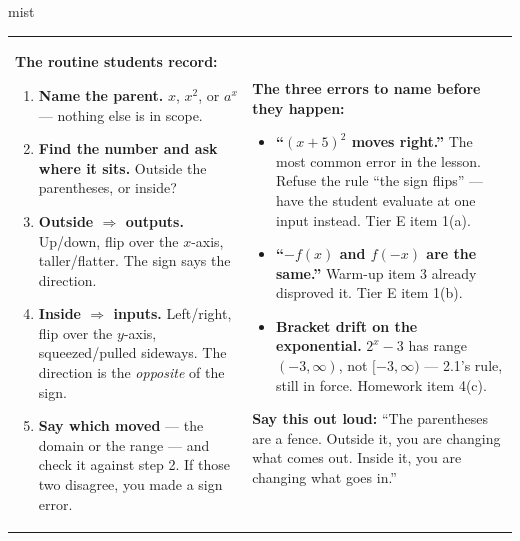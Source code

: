\documentclass[10pt]{article}
\begin{document}
\boxguard
\begin{skillbox}{mist}
\begin{tabularx}{\linewidth}{@{}X|X@{}}
\begin{minipage}[t]{\linewidth}\vspace{0pt}
\textbf{The routine students record:}
\begin{enumerate}[leftmargin=1.4em, itemsep=2pt, topsep=2pt]
  \item \textbf{Name the parent.} $x$, $x^2$, or $a^x$ --- nothing else is in scope.
  \item \textbf{Find the number and ask where it sits.} Outside the parentheses, or inside?
  \item \textbf{Outside $\Rightarrow$ outputs.} Up/down, flip over the $x$-axis, taller/flatter.
        The sign says the direction.
  \item \textbf{Inside $\Rightarrow$ inputs.} Left/right, flip over the $y$-axis,
        squeezed/pulled sideways. The direction is the \emph{opposite} of the sign.
  \item \textbf{Say which moved} --- the domain or the range --- and check it against step 2. If
        those two disagree, you made a sign error.
\end{enumerate}
\end{minipage}
&
\begin{minipage}[t]{\linewidth}\vspace{0pt}
\textbf{The three errors to name before they happen:}
\begin{itemize}[leftmargin=1.1em, itemsep=2pt, topsep=2pt]
  \item \textbf{``$(x+5)^2$ moves right.''} The most common error in the lesson. Refuse the rule
        ``the sign flips'' --- have the student evaluate at one input instead. Tier E item 1(a).
  \item \textbf{``$-f(x)$ and $f(-x)$ are the same.''} Warm-up item 3 already disproved it.
        Tier E item 1(b).
  \item \textbf{Bracket drift on the exponential.} $2^x-3$ has range $(-3,\infty)$, not
        $[-3,\infty)$ --- 2.1's rule, still in force. Homework item 4(c).
\end{itemize}
\textbf{Say this out loud:} ``The parentheses are a fence. Outside it, you are changing what comes
out. Inside it, you are changing what goes in.''
\end{minipage}
\end{tabularx}
\end{skillbox}
\end{document}
